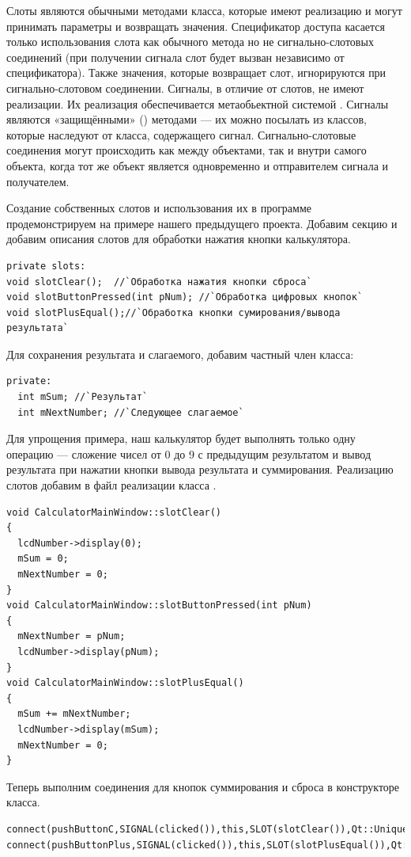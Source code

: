 Слоты являются обычными методами класса, которые имеют реализацию и могут  принимать параметры и возвращать
значения. Спецификатор доступа касается только использования слота как обычного метода но не сигнально-слотовых
соединений (при получении сигнала слот будет вызван независимо от спецификатора). Также значения, которые возвращает
слот, игнорируются при сигнально-слотовом соединении. Сигналы, в отличие от слотов, не имеют реализации. Их реализация
обеспечивается метаобьектной системой . Сигналы являются «защищёнными» () методами --- их можно
посылать из классов, которые наследуют от класса, содержащего сигнал. Сигнально-слотовые соединения могут происходить
как между объектами, так и внутри самого объекта, когда тот же объект является одновременно и отправителем сигнала и
получателем.

Создание собственных слотов и использования их  в программе продемонстрируем на примере нашего
предыдущего проекта. Добавим секцию  и добавим описания слотов для обработки нажатия кнопки
калькулятора.
\begin{lstlisting}
private slots:
void slotClear();  //`Обработка нажатия кнопки сброса`
void slotButtonPressed(int pNum); //`Обработка цифровых кнопок`
void slotPlusEqual();//`Обработка кнопки сумирования/вывода результата`
\end{lstlisting}

Для сохранения результата и слагаемого, добавим частный член класса:
\begin{lstlisting}
private:
  int mSum; //`Результат`
  int mNextNumber; //`Следующее слагаемое`
\end{lstlisting}

Для упрощения примера, наш калькулятор будет выполнять только одну операцию --- сложение чисел от 0 до 9 с предыдущим
результатом и вывод результата при нажатии кнопки вывода результата и суммирования. Реализацию слотов добавим в файл
реализации класса .
\begin{lstlisting}
void CalculatorMainWindow::slotClear()
{
  lcdNumber->display(0);
  mSum = 0;
  mNextNumber = 0;
}
void CalculatorMainWindow::slotButtonPressed(int pNum)
{
  mNextNumber = pNum;
  lcdNumber->display(pNum);
}
void CalculatorMainWindow::slotPlusEqual()
{
  mSum += mNextNumber;
  lcdNumber->display(mSum);
  mNextNumber = 0;
}
\end{lstlisting}

Теперь выполним соединения для кнопок суммирования и сброса в конструкторе класса.
\begin{lstlisting}
connect(pushButtonC,SIGNAL(clicked()),this,SLOT(slotClear()),Qt::UniqueConnection);
connect(pushButtonPlus,SIGNAL(clicked()),this,SLOT(slotPlusEqual()),Qt::UniqueConnection);
\end{lstlisting}

